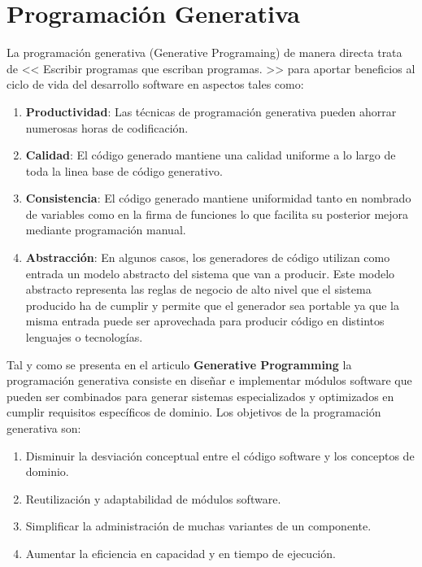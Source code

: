 \documentclass[a4paper,11pt]{book}
\begin{document}
\section{Programación Generativa}

La programación generativa (Generative Programaing) de manera directa trata de << Escribir programas que escriban programas. >>  para aportar beneficios al ciclo de vida del desarrollo software en aspectos tales como: 

\begin{enumerate}
\item \textbf{Productividad}:  Las técnicas de programación generativa pueden ahorrar numerosas horas de codificación.  
\item \textbf{Calidad}: El código generado mantiene una calidad uniforme a lo largo de toda la linea base de código generativo.
\item \textbf{Consistencia}: El código generado mantiene uniformidad tanto en nombrado de variables como en la firma de funciones lo que facilita su posterior mejora mediante programación manual. 
\item \textbf{Abstracción}: En algunos casos, los generadores de código utilizan como entrada un modelo abstracto del sistema que van a producir. Este modelo abstracto representa las reglas de negocio de alto nivel que el sistema producido ha de cumplir y permite que el generador sea portable ya que la misma entrada puede ser aprovechada para producir código en distintos lenguajes o tecnologías. 
\end{enumerate}

Tal y como se presenta en el articulo \textbf{Generative Programming}\cite{gp} la programación generativa consiste en diseñar e implementar módulos software que pueden ser combinados para generar sistemas especializados y  optimizados en cumplir requisitos específicos de dominio. Los objetivos de la programación generativa son:

\begin{enumerate}
\item Disminuir la desviación conceptual entre el código software y los conceptos de dominio.
\item Reutilización y adaptabilidad de módulos software.
\item Simplificar la administración de muchas variantes de un componente.
\item Aumentar la eficiencia  en capacidad y en tiempo de ejecución.
\end{enumerate}
\end{document}
